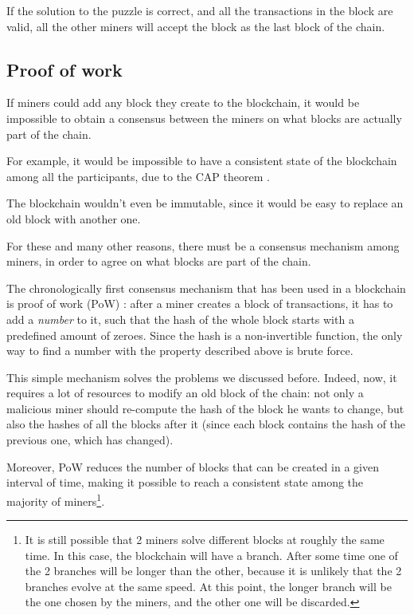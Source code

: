 \documentclass[11pt]{article}
\begin{document}
If the solution to the puzzle is correct, and all the transactions in the block are valid, all the other miners will accept the block as the last block of the chain.

\subsection{Proof of work} \label{subsection:pow}
If miners could add any block they create to the blockchain, it would be impossible to obtain a consensus between the miners on what blocks are actually part of the chain.

For example, it would be impossible to have a consistent state of the blockchain among all the participants, due to the CAP theorem \cite{CAP_theorem}.

The blockchain wouldn't even be immutable, since it would be easy to replace an old block with another one.

For these and many other reasons, there must be a consensus mechanism among miners, in order to agree on what blocks are part of the chain.

The chronologically first consensus mechanism that has been used in a blockchain is proof of work (PoW) \cite{bitcoin_seminal}: after a miner creates a block of transactions, it has to add a \textit{number} to it, such that the hash of the whole block starts with a predefined amount of zeroes.
Since the hash is a non-invertible function, the only way to find a number with the property described above is brute force.

This simple mechanism solves the problems we discussed before. Indeed, now, it requires a lot of resources to modify an old block of the chain: not only a malicious miner should re-compute the hash of the block he wants to change, but also the hashes of all the blocks after it (since each block contains the hash of the previous one, which has changed).

Moreover, PoW reduces the number of blocks that can be created in a given interval of time, making it possible to reach a consistent state among the majority of miners\footnote{It is still possible that 2 miners solve different blocks at roughly the same time. In this case, the blockchain will have a branch. After some time one of the 2 branches will be longer than the other, because it is unlikely that the 2 branches evolve at the same speed. At this point, the longer branch will be the one chosen by the miners, and the other one will be discarded.}.
\end{document}
